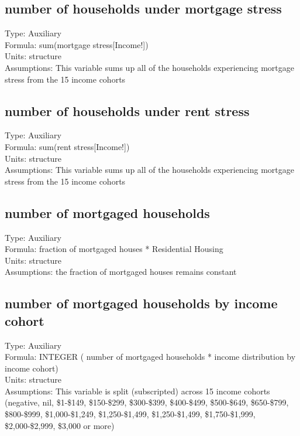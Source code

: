 \documentclass[
  11pt,
]{book}
\begin{document}
\hypertarget{number-of-households-under-mortgage-stress}{%
\subsection{number of households under mortgage stress}\label{number-of-households-under-mortgage-stress}}

Type: Auxiliary\\
Formula: sum(mortgage stress{[}Income!{]})\\
Units: structure\\
Assumptions: This variable sums up all of the households experiencing mortgage stress from the 15 income cohorts

\hypertarget{number-of-households-under-rent-stress}{%
\subsection{number of households under rent stress}\label{number-of-households-under-rent-stress}}

Type: Auxiliary\\
Formula: sum(rent stress{[}Income!{]})\\
Units: structure\\
Assumptions: This variable sums up all of the households experiencing mortgage stress from the 15 income cohorts

\hypertarget{number-of-mortgaged-households}{%
\subsection{number of mortgaged households}\label{number-of-mortgaged-households}}

Type: Auxiliary\\
Formula: fraction of mortgaged houses * Residential Housing\\
Units: structure\\
Assumptions: the fraction of mortgaged houses remains constant

\hypertarget{number-of-mortgaged-households-by-income-cohort}{%
\subsection{number of mortgaged households by income cohort}\label{number-of-mortgaged-households-by-income-cohort}}

Type: Auxiliary\\
Formula: INTEGER ( number of mortgaged households * income distribution by income cohort)\\
Units: structure\\
Assumptions: This variable is split (subscripted) across 15 income cohorts (negative, nil, \$1-\$149, \$150-\$299, \$300-\$399, \$400-\$499, \$500-\$649, \$650-\$799, \$800-\$999, \$1,000-\$1,249, \$1,250-\$1,499, \$1,250-\$1,499, \$1,750-\$1,999, \$2,000-\$2,999, \$3,000 or more)
\end{document}
